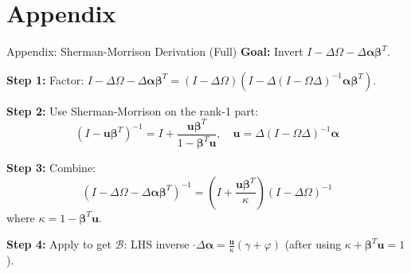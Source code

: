\documentclass[aspectratio=169]{beamer}
\begin{document}
\appendix
\section{Appendix}

\begin{frame}{Appendix: Sherman-Morrison Derivation (Full)}
\textbf{Goal:} Invert $I - \Delta\Omega - \Delta\bm{\alpha}\bm{\beta}^T$.

\textbf{Step 1:} Factor: $I - \Delta\Omega - \Delta\bm{\alpha}\bm{\beta}^T = (I-\Delta\Omega)(I - \Delta(I-\Omega\Delta)^{-1}\bm{\alpha}\bm{\beta}^T)$.

\textbf{Step 2:} Use Sherman-Morrison on the rank-1 part:
\begin{equation*}
    (I - \mathbf{u}\bm{\beta}^T)^{-1} = I + \frac{\mathbf{u}\bm{\beta}^T}{1-\bm{\beta}^T\mathbf{u}}, \quad \mathbf{u} = \Delta(I-\Omega\Delta)^{-1}\bm{\alpha}
\end{equation*}

\textbf{Step 3:} Combine:
\begin{equation*}
    (I-\Delta\Omega-\Delta\bm{\alpha}\bm{\beta}^T)^{-1} = \left(I + \frac{\mathbf{u}\bm{\beta}^T}{\kappa}\right)(I-\Delta\Omega)^{-1}
\end{equation*}
where $\kappa = 1 - \bm{\beta}^T\mathbf{u}$.

\textbf{Step 4:} Apply to get $\mathcal{B}$: LHS inverse $\cdot \Delta\bm{\alpha} = \frac{\mathbf{u}}{\kappa}(\gamma+\varphi)$ (after using $\kappa+\bm{\beta}^T\mathbf{u}=1$).
\end{frame}
\end{document}
